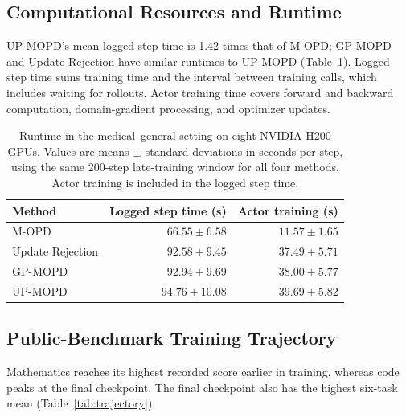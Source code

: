 \documentclass{article}
\begin{document}
\subsection{Computational Resources and Runtime}
\label{app:runtime}

UP-MOPD's mean logged step time is 1.42 times that of M-OPD;
GP-MOPD and Update Rejection have similar runtimes to UP-MOPD
(Table~\ref{tab:runtime}).
Logged step time sums training time and the interval between training
calls, which includes waiting for rollouts.
Actor training time covers forward and backward computation,
domain-gradient processing, and optimizer updates.

\begin{table}[htbp]
\centering
\caption{Runtime in the medical--general setting on eight NVIDIA H200 GPUs.
Values are means $\pm$ standard deviations in seconds per step, using the
same 200-step late-training window for all four methods.
Actor training is included in the logged step time.}
\label{tab:runtime}
\small
\renewcommand{\arraystretch}{1.10}
\begin{tabular*}{\linewidth}{@{\extracolsep{\fill}}lrr@{}}
\toprule
\textbf{Method} & \textbf{Logged step time (s)} & \textbf{Actor training (s)} \\
\midrule
M-OPD & $66.55 \pm 6.58$ & $11.57 \pm 1.65$ \\
Update Rejection & $92.58 \pm 9.45$ & $37.49 \pm 5.71$ \\
GP-MOPD & $92.94 \pm 9.69$ & $38.00 \pm 5.77$ \\
UP-MOPD & $94.76 \pm 10.08$ & $39.69 \pm 5.82$ \\

\bottomrule
\end{tabular*}
\end{table}

\subsection{Public-Benchmark Training Trajectory}
Mathematics reaches its highest recorded score earlier in training,
whereas code peaks at the final checkpoint.
The final checkpoint also has the highest six-task mean
(Table~\ref{tab:trajectory}).
\end{document}
